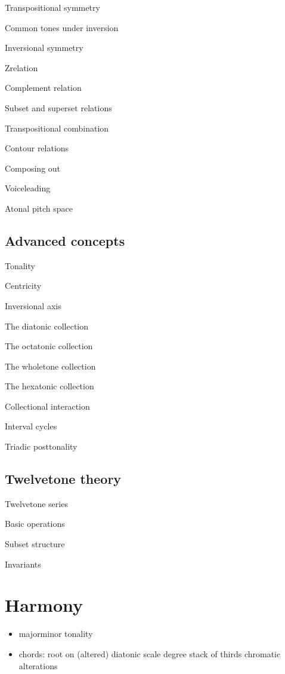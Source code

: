 \documentclass[letterpaper,10pt,english]{sphinxmanual}
\begin{document}
Transpositional symmetry

Common tones under inversion

Inversional symmetry

Z\sphinxhyphen{}relation

Complement relation

Subset and superset relations

Transpositional combination

Contour relations

Composing out

Voice\sphinxhyphen{}leading

Atonal pitch space


\section{Advanced concepts}
\label{\detokenize{3_set_theory:advanced-concepts}}
Tonality

Centricity

Inversional axis

The diatonic collection

The octatonic collection

The whole\sphinxhyphen{}tone collection

The hexatonic collection

Collectional interaction

Interval cycles

Triadic post\sphinxhyphen{}tonality


\section{Twelve\sphinxhyphen{}tone theory}
\label{\detokenize{3_set_theory:twelve-tone-theory}}
Twelve\sphinxhyphen{}tone series

Basic operations

Subset structure

Invariants


\chapter{Harmony}
\label{\detokenize{4_harmony:harmony}}\label{\detokenize{4_harmony::doc}}\begin{itemize}
\item {} 
major\sphinxhyphen{}minor tonality

\item {} 
chords:
\sphinxhyphen{} root on (altered) diatonic scale degree
\sphinxhyphen{} stack of thirds
\sphinxhyphen{} chromatic alterations

\end{itemize}
\end{document}
